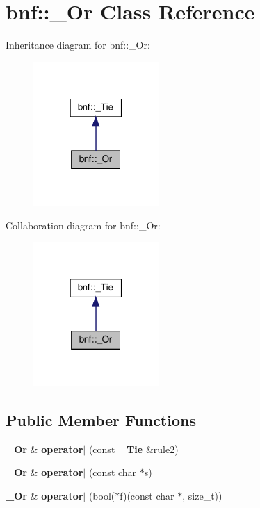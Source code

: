 \section{bnf\+:\+:\+\_\+\+Or Class Reference}
\label{classbnf_1_1___or}


Inheritance diagram for bnf\+:\+:\+\_\+\+Or\+:
\nopagebreak
\begin{figure}[H]
\begin{center}
\leavevmode
\includegraphics[width=135pt]{classbnf_1_1___or__inherit__graph}
\end{center}
\end{figure}


Collaboration diagram for bnf\+:\+:\+\_\+\+Or\+:
\nopagebreak
\begin{figure}[H]
\begin{center}
\leavevmode
\includegraphics[width=135pt]{classbnf_1_1___or__coll__graph}
\end{center}
\end{figure}
\subsection*{Public Member Functions}
\begin{DoxyCompactItemize}
\item 
\mbox{\label{classbnf_1_1___or_ab50193a5c6b0bf1f8f61ba1fe2020187}} 
\textbf{ \+\_\+\+Or} \& {\bfseries operator$\vert$} (const \textbf{ \+\_\+\+Tie} \&rule2)
\item 
\mbox{\label{classbnf_1_1___or_a83447b5a8ad57757568a8f92795eae76}} 
\textbf{ \+\_\+\+Or} \& {\bfseries operator$\vert$} (const char $\ast$s)
\item 
\mbox{\label{classbnf_1_1___or_a23d0d9ca62283285457a6b7893399b0a}} 
\textbf{ \+\_\+\+Or} \& {\bfseries operator$\vert$} (bool($\ast$f)(const char $\ast$, size\+\_\+t))
\end{DoxyCompactItemize}
